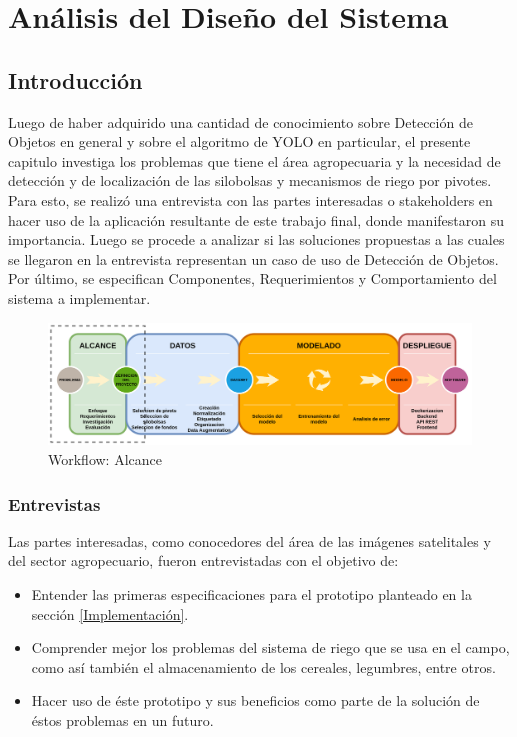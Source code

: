 \chapter{Análisis del Diseño del Sistema}
\label{Análisis del Diseño del Sistema}

\section{Introducción}
Luego de haber adquirido una cantidad de conocimiento sobre Detección de Objetos en general y sobre el algoritmo de YOLO en particular, el presente capitulo 
investiga los problemas que tiene el área agropecuaria y la necesidad de detección y de localización de las silobolsas y mecanismos de riego por pivotes. Para esto, se realizó una entrevista con las partes interesadas o stakeholders en hacer uso de la aplicación resultante de este trabajo final, donde manifestaron su importancia. Luego se procede a analizar si las soluciones propuestas a las cuales se llegaron en la entrevista representan un caso de uso de Detección de Objetos. Por último, se especifican Componentes, Requerimientos y Comportamiento del sistema a implementar.
\begin{figure}[h!]
    \centering
    \includegraphics[width=1.2\textwidth,center]{img/Wokflow - alcance.drawio.png}
    \caption{Workflow: Alcance}
    \label{fig:workflow - alcance}
\end{figure}

\subsection{Entrevistas}


Las partes interesadas, como conocedores del área de las imágenes satelitales y del sector agropecuario, fueron entrevistadas con el objetivo de:
\begin{itemize}
    \item Entender las primeras especificaciones para el prototipo planteado en la sección \ref{Implementación}.
    \item Comprender mejor los problemas del sistema de riego que se usa en el campo, como así también el almacenamiento de los cereales, legumbres, entre otros.
    \item Hacer uso de éste prototipo y sus beneficios como parte de la solución de éstos problemas en un futuro.
\end{itemize}

